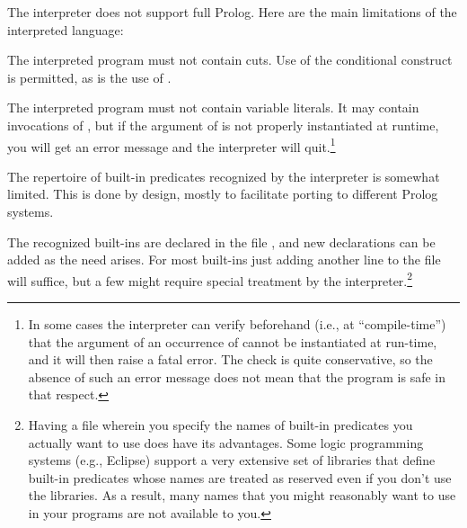 



The interpreter does not support full Prolog.  Here are the main limitations
of the interpreted language:
\begin{Enumerate}

\item
  The interpreted program must not contain cuts.  Use of the
  conditional construct is permitted, as is the
  use of .

\item
  The interpreted program must not contain variable literals.  It may contain invocations of , but if the
  argument of  is not properly instantiated at runtime, you will
  get an error message and the interpreter will quit.\footnote{
    In some cases the interpreter can verify beforehand (i.e., at
    ``compile-time'') that the argument of an occurrence of 
    cannot be instantiated at run-time, and it will then raise a fatal error.
    The check is quite conservative, so the absence of such an error message
    does not mean that the program is safe in that respect.}

\item
  The repertoire of built-in predicates recognized
  by the interpreter is somewhat limited.  This is done by design, mostly to
  facilitate porting to different Prolog systems.

  The recognized built-ins are declared in the file ,
  and new declarations can be added as the need arises.  For most built-ins
  just adding another line to the file will suffice, but a few might
  require special treatment by the interpreter.\footnote{
    Having a file wherein you specify the names of built-in predicates you
    actually want to use does have its advantages.  Some logic programming
    systems (e.g., Eclipse) support a very extensive set of libraries that
    define built-in predicates whose names are treated as reserved even if
    you don't use the libraries.  As a result, many names that you might
    reasonably want to use in your programs are not available to you.}
\end{Enumerate}

